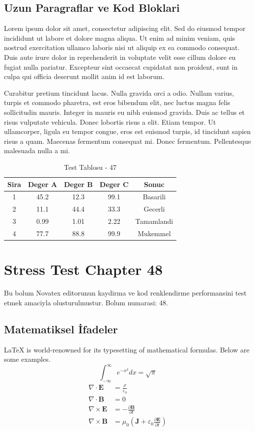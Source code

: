 \documentclass[12pt,a4paper]{article}
\begin{document}
\subsection{Uzun Paragraflar ve Kod Bloklari}
Lorem ipsum dolor sit amet, consectetur adipiscing elit. Sed do eiusmod tempor incididunt ut labore et dolore magna aliqua. Ut enim ad minim veniam, quis nostrud exercitation ullamco laboris nisi ut aliquip ex ea commodo consequat. Duis aute irure dolor in reprehenderit in voluptate velit esse cillum dolore eu fugiat nulla pariatur. Excepteur sint occaecat cupidatat non proident, sunt in culpa qui officia deserunt mollit anim id est laborum.

Curabitur pretium tincidunt lacus. Nulla gravida orci a odio. Nullam varius, turpis et commodo pharetra, est eros bibendum elit, nec luctus magna felis sollicitudin mauris. Integer in mauris eu nibh euismod gravida. Duis ac tellus et risus vulputate vehicula. Donec lobortis risus a elit. Etiam tempor. Ut ullamcorper, ligula eu tempor congue, eros est euismod turpis, id tincidunt sapien risus a quam. Maecenas fermentum consequat mi. Donec fermentum. Pellentesque malesuada nulla a mi.

\begin{table}[h!]
\centering
\begin{tabular}{|c|c|c|c|c|}
\hline
\textbf{Sira} & \textbf{Deger A} & \textbf{Deger B} & \textbf{Deger C} & \textbf{Sonuc} \\
\hline
1 & 45.2 & 12.3 & 99.1 & Basarili \\
2 & 11.1 & 44.4 & 33.3 & Gecerli \\
3 & 0.99 & 1.01 & 2.22 & Tamamlandi \\
4 & 77.7 & 88.8 & 99.9 & Mukemmel \\
\hline
\end{tabular}
\caption{Test Tablosu - 47}
\end{table}

\newpage
\section{Stress Test Chapter 48}
Bu bolum Novatex editorunun kaydirma ve kod renklendirme performansini test etmek amaciyla olusturulmustur. Bolum numarasi: 48.

\subsection{Matematiksel İfadeler}
\LaTeX{} is world-renowned for its typesetting of mathematical formulas. Below are some examples.
\begin{equation}
\int_{-\infty}^{\infty} e^{-x^2} dx = \sqrt{\pi}
\end{equation}
\begin{align}
\nabla \cdot \mathbf{E} &= \frac{\rho}{\varepsilon_0} \\
\nabla \cdot \mathbf{B} &= 0 \\
\nabla \times \mathbf{E} &= -\frac{\partial \mathbf{B}}{\partial t} \\
\nabla \times \mathbf{B} &= \mu_0\left(\mathbf{J} + \varepsilon_0 \frac{\partial \mathbf{E}}{\partial t}\right)
\end{align}
\end{document}
